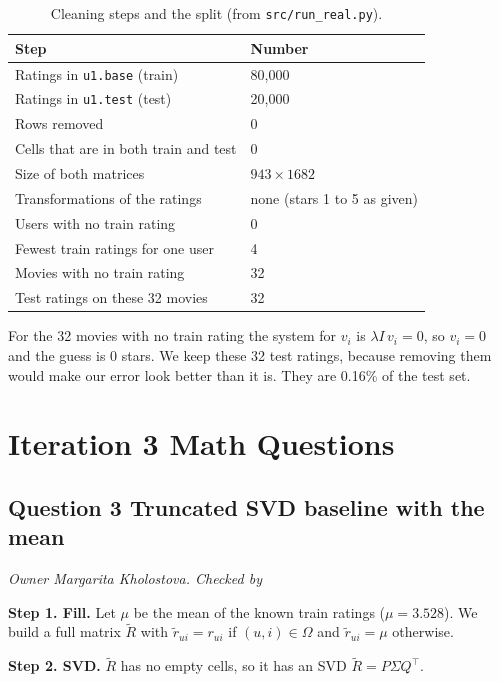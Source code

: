 \begin{table}[h]
\centering
\begin{tabular}{ll}
\hline
Step & Number \\
\hline
Ratings in \texttt{u1.base} (train) & 80{,}000 \\
Ratings in \texttt{u1.test} (test) & 20{,}000 \\
Rows removed & 0 \\
Cells that are in both train and test & 0 \\
Size of both matrices & $943 \times 1682$ \\
Transformations of the ratings & none (stars 1 to 5 as given) \\
Users with no train rating & 0 \\
Fewest train ratings for one user & 4 \\
Movies with no train rating & 32 \\
Test ratings on these 32 movies & 32 \\
\hline
\end{tabular}
\caption{Cleaning steps and the split (from \texttt{src/run\_real.py}).}
\label{tab:clean}
\end{table}

For the 32 movies with no train rating the system for $v_i$ is $\lambda I\, v_i = 0$, so $v_i = 0$ and the guess is 0 stars. We keep these 32 test ratings, because removing them would make our error look better than it is. They are 0.16\% of the test set.

\section{Iteration 3 Math Questions}

\subsection*{Question 3 Truncated SVD baseline with the mean}
\textit{Owner Margarita Kholostova. Checked by \underline{\hspace{4cm}}}

\textbf{Step 1. Fill.} Let $\mu$ be the mean of the known train ratings ($\mu = 3.528$). We build a full matrix $\tilde R$ with $\tilde r_{ui} = r_{ui}$ if $(u,i) \in \Omega$ and $\tilde r_{ui} = \mu$ otherwise.

\textbf{Step 2. SVD.} $\tilde R$ has no empty cells, so it has an SVD $\tilde R = P \Sigma Q^\top$.

